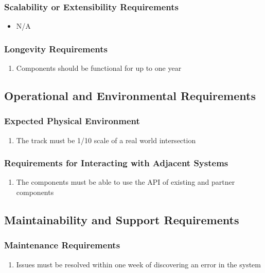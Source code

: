\documentclass [11pt]{article}
\begin{document}
\subsubsection{Scalability or Extensibility Requirements }
	\begin{itemize}
		\item N/A
	\end{itemize}
		
\subsubsection{Longevity Requirements }
	\begin{enumerate}[label=\textbf{\Alph*}:]
		\item Components should be functional for up to one year
	\end{enumerate}

\subsection{Operational and Environmental Requirements}
\subsubsection{Expected Physical Environment }
	\begin{enumerate}[label=\textbf{\Alph*}:]
		\item The track must be 1/10 scale of a real world intersection
	\end{enumerate}
		
\subsubsection{Requirements for Interacting with Adjacent Systems}
	\begin{enumerate}[label=\textbf{\Alph*}:]
		\item The components must be able to use the API of existing and partner components
	\end{enumerate}

\subsection{Maintainability and Support Requirements }
\subsubsection{Maintenance Requirements }
	\begin{enumerate}[label=\textbf{\Alph*}:]
		\item  Issues must be resolved within one week of discovering an error in the system
	\end{enumerate}
\end{document}
